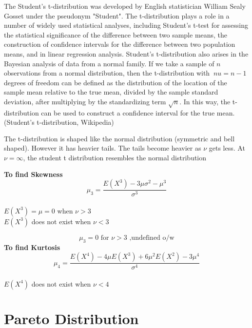 \documentclass[14pt, a4paper]{article}
\theoremstyle{definition}
\begin{document}
The Student's t-distribution was developed by English statistician William Sealy Gosset under the pseudonym "Student". The t-distribution plays a role in a number of widely used statistical analyses, including Student's t-test for assessing the statistical significance of the difference between two sample means, the construction of confidence intervals for the difference between two population means, and in linear regression analysis. Student's t-distribution also arises in the Bayesian analysis of data from a normal family. If we take a sample of $n$ observations from a normal distribution, then the t-distribution with $ \ nu =n-1$ degrees of freedom can be defined as the distribution of the location of the sample mean relative to the true mean, divided by the sample standard deviation, after multiplying by the standardizing term $\sqrt {n}$. In this way, the t-distribution can be used to construct a confidence interval for the true mean.(Student's t-distribution, Wikipedia)

The t-distribution is shaped like the normal distribution (symmetric and bell shaped). However it has heavier tails. The tails become heavier as $\nu$ gets less. At $\nu = \infty$, the student t distribution resembles the normal distribution

\textbf{To find Skewness}
\[ \mu_3= \frac{E(X^3) - 3 \mu \sigma^2 - \mu^3}{ \sigma^3} \]
\\ $E(X^3) = \mu = 0$ when $\nu > 3$
\\ $E(X^3)$ does not exist when $\nu < 3$

\[ \mu_3= 0 \text{ for } \nu > 3 \text{ ,undefined o/w}\]
\textbf{To find Kurtosis}
\[ \mu_4 = \frac{ E(X^4) - 4 \mu E(X^3) + 6 \mu^2 E(X^2) - 3 \mu^4}{ \sigma^4} \]
\\ $E(X^4)$ does not exist when $\nu < 4$



\section{Pareto Distribution}
\end{document}
